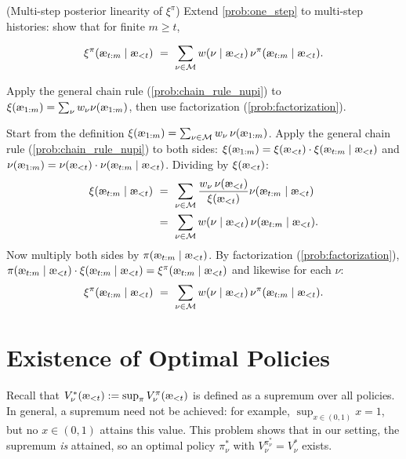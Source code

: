 \documentclass[fontsize=11pt, parskip=half]{scrartcl}
\newcommand{\cM}{\mathcal{M}}
\newcommand{\aes}{\textnormal{\ae}}
\begin{document}
\begin{exercise}
\label{prob:multi_step_xi}
\skippable
(Multi-step posterior linearity of $\xi^\pi$)
Extend \cref{prob:one_step} to multi-step histories: show that for finite $m \geq t$,

\[
    \xi^\pi(\aes_{t:m} \mid \aes_{<t})
    ~=~ \sum_{\nu \in \cM} w(\nu \mid \aes_{<t})\, \nu^\pi(\aes_{t:m} \mid \aes_{<t}).
\]
\begin{hint}
Apply the general chain rule (\cref{prob:chain_rule_nupi}) to $\xi(\aes_{1:m}) = \sum_\nu w_\nu \nu(\aes_{1:m})$, then use factorization (\cref{prob:factorization}).
\end{hint}
\end{exercise}

\begin{solution}
Start from the definition $\xi(\aes_{1:m}) = \sum_{\nu \in \cM} w_\nu\, \nu(\aes_{1:m})$.
Apply the general chain rule (\cref{prob:chain_rule_nupi}) to both sides: $\xi(\aes_{1:m}) = \xi(\aes_{<t}) \cdot \xi(\aes_{t:m} \mid \aes_{<t})$ and $\nu(\aes_{1:m}) = \nu(\aes_{<t}) \cdot \nu(\aes_{t:m} \mid \aes_{<t})$.
Dividing by $\xi(\aes_{<t})$:
\begin{align*}
    \xi(\aes_{t:m} \mid \aes_{<t})
    ~&=~ \sum_{\nu \in \cM} \frac{w_\nu\, \nu(\aes_{<t})}{\xi(\aes_{<t})} \nu(\aes_{t:m} \mid \aes_{<t}) \\
    ~&=~ \sum_{\nu \in \cM} w(\nu \mid \aes_{<t})\, \nu(\aes_{t:m} \mid \aes_{<t}).
\end{align*}
Now multiply both sides by $\pi(\aes_{t:m} \mid \aes_{<t})$.
By factorization (\cref{prob:factorization}), $\pi(\aes_{t:m} \mid \aes_{<t}) \cdot \xi(\aes_{t:m} \mid \aes_{<t}) = \xi^\pi(\aes_{t:m} \mid \aes_{<t})$ and likewise for each $\nu$:
\[
    \xi^\pi(\aes_{t:m} \mid \aes_{<t})
    ~=~ \sum_{\nu \in \cM} w(\nu \mid \aes_{<t})\, \nu^\pi(\aes_{t:m} \mid \aes_{<t}).
\]
\end{solution}


\section{Existence of Optimal Policies}\label{prob:optimal_exists}

Recall that $V_\nu^*(\aes_{<t}) := \sup_\pi V_\nu^\pi(\aes_{<t})$ is defined as a supremum over all policies. In general, a supremum need not be achieved: for example, $\sup_{x \in (0,1)} x = 1$, but no $x \in (0,1)$ attains this value. This problem shows that in our setting, the supremum \emph{is} attained, so an optimal policy $\pi_\nu^*$ with $V_\nu^{\pi_\nu^*} = V_\nu^*$ exists.
\end{document}
